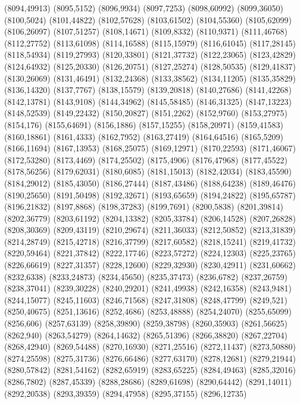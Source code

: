 (8094,49913)
(8095,5152)
(8096,9934)
(8097,7253)
(8098,60992)
(8099,36050)
(8100,5024)
(8101,44822)
(8102,57628)
(8103,61502)
(8104,55360)
(8105,62099)
(8106,26097)
(8107,51257)
(8108,14671)
(8109,8332)
(8110,9371)
(8111,46768)
(8112,27752)
(8113,61098)
(8114,16588)
(8115,15979)
(8116,61045)
(8117,28145)
(8118,54934)
(8119,27993)
(8120,33801)
(8121,37732)
(8122,23065)
(8123,42829)
(8124,64932)
(8125,20330)
(8126,20751)
(8127,25274)
(8128,50535)
(8129,41837)
(8130,26069)
(8131,46491)
(8132,24368)
(8133,38562)
(8134,11205)
(8135,35829)
(8136,14320)
(8137,7767)
(8138,15579)
(8139,20818)
(8140,27686)
(8141,42268)
(8142,13781)
(8143,9108)
(8144,34962)
(8145,58485)
(8146,31325)
(8147,13223)
(8148,52539)
(8149,22432)
(8150,20827)
(8151,2262)
(8152,9760)
(8153,27975)
(8154,176)
(8155,64691)
(8156,1886)
(8157,15255)
(8158,20971)
(8159,41583)
(8160,18861)
(8161,4333)
(8162,7952)
(8163,27419)
(8164,64516)
(8165,5209)
(8166,11694)
(8167,13953)
(8168,25075)
(8169,12971)
(8170,22593)
(8171,46067)
(8172,53280)
(8173,4469)
(8174,25502)
(8175,4906)
(8176,47968)
(8177,45522)
(8178,56256)
(8179,62031)
(8180,6085)
(8181,15013)
(8182,42034)
(8183,45590)
(8184,29012)
(8185,43050)
(8186,27444)
(8187,43486)
(8188,64238)
(8189,46476)
(8190,25650)
(8191,50498)
(8192,32671)
(8193,65659)
(8194,24822)
(8195,65787)
(8196,21832)
(8197,8868)
(8198,37283)
(8199,7691)
(8200,5838)
(8201,39814)
(8202,36779)
(8203,61192)
(8204,13382)
(8205,33784)
(8206,14528)
(8207,26828)
(8208,30369)
(8209,43119)
(8210,29674)
(8211,36033)
(8212,50852)
(8213,31839)
(8214,28749)
(8215,42718)
(8216,37799)
(8217,60582)
(8218,15241)
(8219,41732)
(8220,59464)
(8221,37842)
(8222,17746)
(8223,57272)
(8224,12303)
(8225,23765)
(8226,66619)
(8227,31357)
(8228,12600)
(8229,32930)
(8230,42911)
(8231,60662)
(8232,6338)
(8233,24873)
(8234,45650)
(8235,37473)
(8236,6782)
(8237,26759)
(8238,37041)
(8239,30228)
(8240,29201)
(8241,49938)
(8242,16358)
(8243,9481)
(8244,15077)
(8245,11603)
(8246,71568)
(8247,31808)
(8248,47799)
(8249,521)
(8250,40675)
(8251,13616)
(8252,4686)
(8253,48888)
(8254,24070)
(8255,65099)
(8256,606)
(8257,63139)
(8258,39890)
(8259,38798)
(8260,35903)
(8261,56625)
(8262,940)
(8263,54279)
(8264,14632)
(8265,51396)
(8266,38820)
(8267,22704)
(8268,42940)
(8269,54488)
(8270,16930)
(8271,25516)
(8272,11437)
(8273,50880)
(8274,25598)
(8275,31736)
(8276,66486)
(8277,63170)
(8278,12681)
(8279,21944)
(8280,57842)
(8281,54162)
(8282,65919)
(8283,65225)
(8284,49463)
(8285,32016)
(8286,7802)
(8287,45339)
(8288,28686)
(8289,61698)
(8290,64442)
(8291,14011)
(8292,20538)
(8293,39359)
(8294,47958)
(8295,37155)
(8296,12735)
